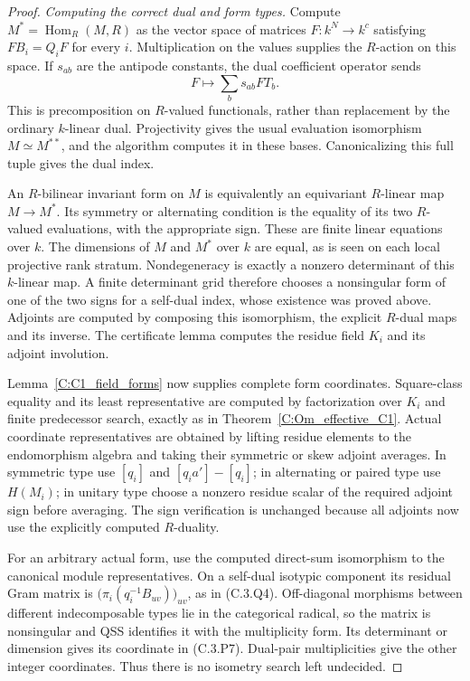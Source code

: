 \begin{proof}
\emph{Computing the correct dual and form types.}
Compute
$M^*=\operatorname{Hom}_R(M,R)$ as the vector space of
matrices $F:k^N\to k^c$ satisfying
$FB_i=Q_iF$ for every $i$.
Multiplication on the values supplies the $R$-action
on this space. If $s_{ab}$ are the antipode constants,
the dual coefficient operator sends
\[
                       F\longmapsto
                             \sum_b s_{ab}F T_b .
                                                               \tag{C.3.P10}
\]
This is precomposition on $R$-valued functionals, rather
than replacement by the ordinary $k$-linear dual.
Projectivity gives the usual evaluation isomorphism
$M\simeq M^{**}$, and the algorithm computes it in these
bases. Canonicalizing this full tuple gives the dual index.

An $R$-bilinear invariant form on $M$ is equivalently an
equivariant $R$-linear map $M\to M^*$.
Its symmetry or alternating condition is the equality
of its two $R$-valued evaluations, with the appropriate
sign. These are finite linear equations over $k$.
The dimensions of $M$ and $M^*$ over $k$ are equal, as
is seen on each local projective rank stratum.
Nondegeneracy is exactly a nonzero determinant of this
$k$-linear map. A finite determinant grid therefore
chooses a nonsingular form of one of the two signs
for a self-dual index, whose existence was proved above.
Adjoints are computed by composing this isomorphism,
the explicit $R$-dual maps and its inverse.
The certificate lemma computes the residue field
$K_i$ and its adjoint involution.

Lemma~\ref{C:C1_field_forms} now supplies complete
form coordinates. Square-class equality and its least
representative are computed by factorization over
$K_i$ and finite predecessor search, exactly as in
Theorem~\ref{C:Om_effective_C1}. Actual coordinate
representatives are obtained by lifting residue elements
to the endomorphism algebra and taking their symmetric
or skew adjoint averages. In symmetric type use
$[q_i]$ and $[q_i a']-[q_i]$; in alternating or paired
type use $H(M_i)$; in unitary type choose a nonzero
residue scalar of the required adjoint sign before
averaging. The sign verification is unchanged because
all adjoints now use the explicitly computed $R$-duality.

For an arbitrary actual form, use the computed direct-sum
isomorphism to the canonical module representatives.
On a self-dual isotypic component its residual Gram matrix is
$\bigl(\pi_i(q_i^{-1}B_{uv})\bigr)_{uv}$, as in (C.3.Q4).
Off-diagonal morphisms between different indecomposable
types lie in the categorical radical, so the matrix is
nonsingular and QSS identifies it with the multiplicity
form. Its determinant or dimension gives its coordinate
in (C.3.P7). Dual-pair multiplicities give the other
integer coordinates. Thus there is no isometry search
left undecided.


\end{proof}
